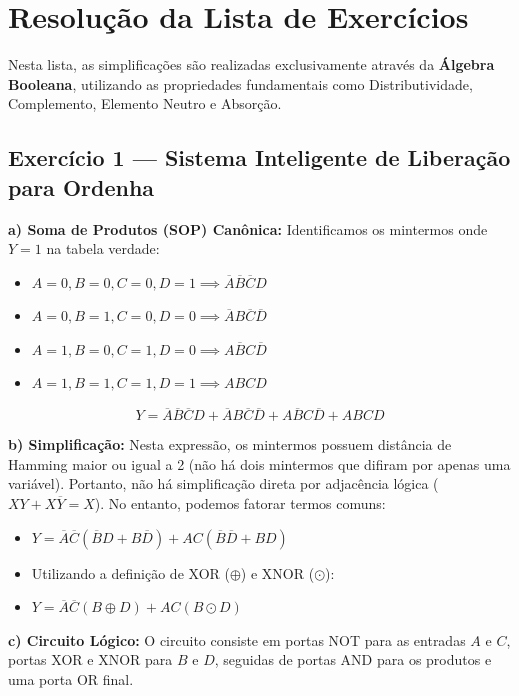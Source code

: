 \documentclass[12pt]{article}
\begin{document}
\section*{Resolução da Lista de Exercícios}

Nesta lista, as simplificações são realizadas exclusivamente através da \textbf{Álgebra Booleana}, utilizando as propriedades fundamentais como Distributividade, Complemento, Elemento Neutro e Absorção.

\subsection*{Exercício 1 — Sistema Inteligente de Liberação para Ordenha}

\begin{solucao}
\textbf{a) Soma de Produtos (SOP) Canônica:}
Identificamos os mintermos onde $Y = 1$ na tabela verdade:
\begin{itemize}
    \item $A=0, B=0, C=0, D=1 \implies \overline{A}\overline{B}\overline{C}D$
    \item $A=0, B=1, C=0, D=0 \implies \overline{A}B\overline{C}\overline{D}$
    \item $A=1, B=0, C=1, D=0 \implies A\overline{B}C\overline{D}$
    \item $A=1, B=1, C=1, D=1 \implies ABCD$
\end{itemize}
\[ Y = \overline{A}\overline{B}\overline{C}D + \overline{A}B\overline{C}\overline{D} + A\overline{B}C\overline{D} + ABCD \]

\textbf{b) Simplificação:}
Nesta expressão, os mintermos possuem distância de Hamming maior ou igual a 2 (não há dois mintermos que difiram por apenas uma variável). Portanto, não há simplificação direta por adjacência lógica ($XY + X\overline{Y} = X$). No entanto, podemos fatorar termos comuns:
\begin{itemize}
    \item $Y = \overline{A}\overline{C}(\overline{B}D + B\overline{D}) + AC(\overline{B}\overline{D} + BD)$
    \item Utilizando a definição de XOR ($\oplus$) e XNOR ($\odot$):
    \item $Y = \overline{A}\overline{C}(B \oplus D) + AC(B \odot D)$
\end{itemize}

\textbf{c) Circuito Lógico:}
O circuito consiste em portas NOT para as entradas $A$ e $C$, portas XOR e XNOR para $B$ e $D$, seguidas de portas AND para os produtos e uma porta OR final.
\end{solucao}
\end{document}
